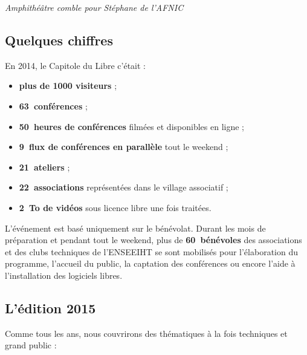 \begin{center}
\textit{Amphithéâtre comble pour Stéphane  de l'AFNIC}
\end{center}

\subsection{Quelques chiffres}

\begin{minipage}{0.6\textwidth}
En 2014, le Capitole du Libre c'était :
\begin{itemize}[label=$\bullet$]
\item \textbf{plus de \num{1000} visiteurs} ;
\item \textbf{63~conférences} ;
\item \textbf{50~heures de conférences} filmées et disponibles en ligne ;
\item \textbf{9~flux de conférences en parallèle} tout le weekend ;
\item \textbf{21~ateliers} ;
\item \textbf{22~associations} représentées dans le village associatif ;
\item \textbf{\SI{2}{\tera o} de vidéos} sous licence libre une fois traitées.
\end{itemize}
\end{minipage}
\begin{minipage}{0.4\textwidth}
\begin{center}
\end{center}
\end{minipage}

\Separateur

L’événement est basé uniquement sur le bénévolat.
 Durant les mois de préparation et pendant tout le weekend,
 plus de \textbf{60~bénévoles} des associations et des clubs techniques
 de l’ENSEEIHT se sont mobilisés pour l’élaboration du programme,
 l’accueil du public, la captation des conférences ou encore l’aide
 à l’installation des logiciels libres.


\subsection{L'édition 2015}

Comme tous les ans, nous couvrirons des thématiques à la fois techniques et grand 
public :

